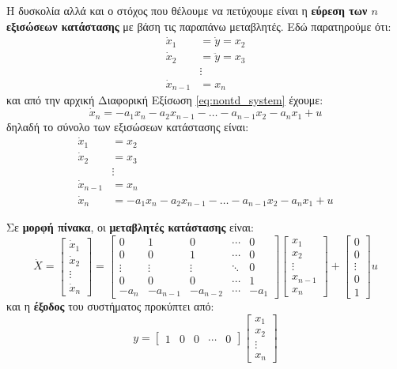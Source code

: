 \documentclass[11pt,a4paper,notitlepage,fleqn]{article}
\begin{document}
Η δυσκολία αλλά και ο στόχος που θέλουμε να πετύχουμε είναι η \textbf{εύρεση των \( n \) εξισώσεων κατάστασης} με βάση τις παραπάνω μεταβλητές. Εδώ παρατηρούμε ότι:
\begin{align*}
	\dot x_1 &= \dot y = x_2\\
	\dot x_2 &= \ddot y = x_3 \\
	&\vdots \\
	\dot x_{n-1} &= x_n
\end{align*}
και από την αρχική Διαφορική Εξίσωση \eqref{eq:nontd_system} έχουμε:
\[
\dot x_n = -a_1x_n -a_2x_{n-1} - \dots - a_{n-1}x_2 -a_nx_1 + u
\]
δηλαδή το σύνολο των εξισώσεων κατάστασης είναι:
\begin{align*}
\dot x_1 &= x_2\\
\dot x_2 &= x_3 \\
&\vdots \\
\dot x_{n-1} &= x_n\\
\dot x_n &= -a_1x_n -a_2x_{n-1} - \dots - a_{n-1}x_2 -a_nx_1 + u
\end{align*}

Σε \textbf{μορφή πίνακα}, οι \textbf{μεταβλητές κατάστασης} είναι:
\[
\dot X = \left[\begin{matrix}
\dot x_1 \\ \dot x_2 \\ \vdots \\ \dot x_n
\end{matrix}\right] = \left[
\begin{matrix}
0 & 1 & 0 & \cdots & 0 \\
0 & 0 & 1 & \cdots & 0 \\
\vdots & \vdots & \vdots & \ddots & 0\\
0 & 0 & 0 & \cdots & 1 \\
-a_n & - a_{n-1} & - a_{n-2} & \cdots & -a_1
\end{matrix}
\right] \left[\begin{matrix}
x_1 \\  x_2 \\ \vdots \\ x_{n-1} \\ x_n
\end{matrix}\right]
+ \left[\begin{matrix}
0\\0\\\vdots\\0\\1
\end{matrix}\right]u
\]
και η \textbf{έξοδος} του συστήματος προκύπτει από:
\[
y= \left[\begin{matrix}
1 & 0 & 0 & \cdots & 0
\end{matrix}\right]\left[\begin{matrix}
x_1\\x_2\\\vdots\\x_n
\end{matrix}\right]
\]
\end{document}
